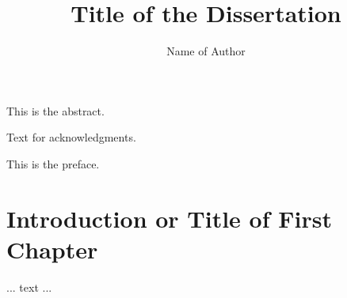 \documentclass[12pt]{nuthesis}	%
\author{Name of Author}
\title{Title of the Dissertation}
\begin{document}
%	
%


\frontmatter		%

\maketitle		%

\copyrightpage		%


\abstract		%

This is the abstract.

\acknowledgements	%

Text for acknowledgments.

\preface		%

This is the preface.


%
%
%
%
%
%
%
%

\clearpage{} %
\tableofcontents	%

\clearpage{} %
\listoftables		%

\clearpage{} %
\listoffigures		%



\mainmatter             %



\chapter{Introduction or Title of First Chapter}	%
	... text ...		%
\end{document}
